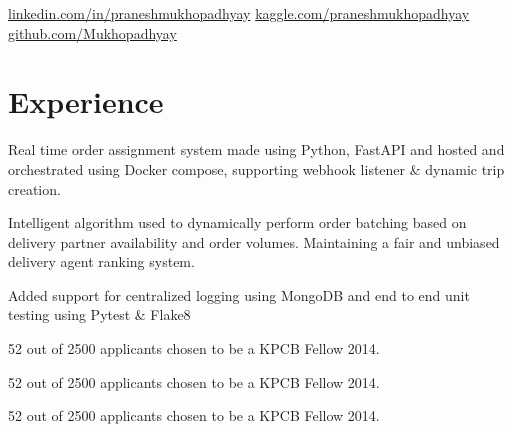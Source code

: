 \documentclass[]{deedy-resume-openfont}
\begin{document}
%
%
\lastupdated

%
%


\namesection{Pranesh}{Mukhopadhyay}{
\href{mailto:praneshmukherjee7@gmail.com}{praneshmukherjee7@gmail.com} | 96747-70912
}


\href{https://www.linkedin.com/in/praneshmukhopadhyay/}{ linkedin.com/in/praneshmukhopadhyay} \; \href{https://www.kaggle.com/praneshmukhopadhyay}{ kaggle.com/praneshmukhopadhyay} \; \href{https://github.com/Mukhopadhyay}{ github.com/Mukhopadhyay}



\section{Experience}

\vspace{\topsep} %

\begin{tightemize}
\item Real time order assignment system made using Python, FastAPI and hosted and orchestrated using Docker compose, supporting webhook listener \& dynamic trip creation.
\item Intelligent algorithm used to dynamically perform order batching based on delivery partner availability and order volumes. Maintaining a fair and unbiased delivery agent ranking system.
\item Added support for centralized logging using MongoDB and end to end unit testing using Pytest \& Flake8
\end{tightemize}

\begin{tightemize}
\item 52 out of 2500 applicants chosen to be a KPCB Fellow 2014.
\item 52 out of 2500 applicants chosen to be a KPCB Fellow 2014.
\item 52 out of 2500 applicants chosen to be a KPCB Fellow 2014.
\end{tightemize}
\end{document}
